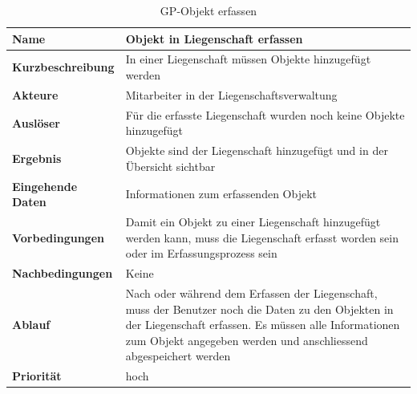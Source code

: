 \begin{table}[H]
  \centering
  \settowidth{}
  \setlength\extrarowheight{2pt}
  \begin{tabulary}{1.0\textwidth}{|a|m{12cm}|}
    \hline
    \textbf{Name}&Objekt in Liegenschaft erfassen\\
    \hline 
    \textbf{Kurzbeschreibung} & In einer Liegenschaft müssen Objekte hinzugefügt werden \\
    \hline
    \textbf{Akteure} & Mitarbeiter in der Liegenschaftsverwaltung\\
    \hline
    \textbf{Auslöser} & Für die erfasste Liegenschaft wurden noch keine Objekte hinzugefügt\\
    \textbf{Ergebnis} & Objekte sind der Liegenschaft hinzugefügt und in der Übersicht sichtbar\\
    \hline
    \textbf{Eingehende Daten} & Informationen zum erfassenden Objekt\\
    \hline
    \textbf{Vorbedingungen} & Damit ein Objekt zu einer Liegenschaft hinzugefügt werden kann, muss die Liegenschaft erfasst worden sein oder im Erfassungsprozess sein\\
    \hline
    \textbf{Nachbedingungen} & Keine\\
    \hline
    \textbf{Ablauf} & Nach oder während dem Erfassen der Liegenschaft, muss der Benutzer noch die Daten zu den Objekten in der Liegenschaft erfassen. Es müssen alle Informationen zum Objekt angegeben werden und anschliessend abgespeichert werden\\
    \hline
    \textbf{Priorität} & hoch\\
    \hline
  \end{tabulary}
  \caption{GP-Objekt erfassen}
\end{table}

